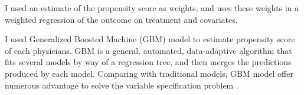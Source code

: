 I used an estimate of the propensity score as weights, and uses these weights in a weighted regression of the outcome on treatment and covariates.

I used Generalized Boosted Machine (GBM) model to estimate propensity score of each physicians. GBM is a general, automated, data-adaptive algorithm that fits several models by way of a regression tree, and then merges the predictions produced by each model. Comparing with traditional models, GBM model offer numerous advantage to solve the variable specification problem \citep{guo2009propensity}. 
